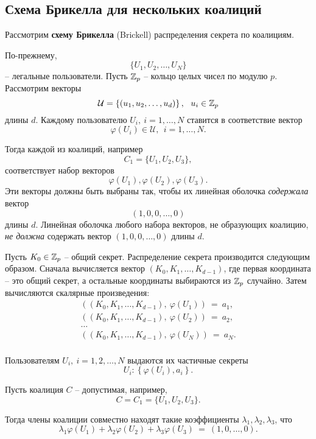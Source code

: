 \subsection{Схема Брикелла для нескольких коалиций}

Рассмотрим \textbf{схему Брикелла} (Brickell) распределения секрета по коалициям.

По-прежнему,
    \[ \{ U_1, U_2, \dots, U_N \} \]
-- легальные пользователи. Пусть $\mathbb{Z}_p$ -- кольцо целых чисел по модулю $p$. Рассмотрим векторы
    \[ \mathcal{U} = \left\{ (u_1, u_2, \dots, u_d) \right\}, ~~ u_i \in \mathbb{Z}_p \]
длины $d$. Каждому пользователю $U_i, ~ i = 1, \dots, N$ ставится в соответствие вектор
    \[ \varphi(U_i) \in \mathcal{U}, ~~ i = 1, \dots, N. \]

Тогда каждой из коалиций, например
    \[ C_1 = \{ U_1, U_2, U_3 \}, \]
соответствует набор векторов
    \[ \varphi(U_1), \varphi(U_2), \varphi(U_3). \]
Эти векторы должны быть выбраны так, чтобы их линейная оболочка \emph{содержала} вектор
    \[ (1, 0, 0, \dots, 0) \]
длины $d$. Линейная оболочка любого набора векторов, не образующих коалицию, \emph{не должна} содержать вектор $(1, 0, 0, \dots, 0)$ длины $d$.

Пусть $K_0 \in \mathbb{Z}_p$ -- общий секрет. Распределение секрета производится следующим образом. Сначала вычисляется вектор $(K_0, K_1, \dots, K_{d-1})$, где первая координата -- это общий секрет, а остальные координаты выбираются из $\mathbb{Z}_p$ случайно. Затем вычисляются скалярные произведения:
\[\begin{array}{l}
	\left( \left( K_0, K_1, \dots, K_{d-1} \right), ~ \varphi(U_1) \right) ~=~ a_1, \\
	\left( \left( K_0, K_1, \dots, K_{d-1} \right), ~ \varphi(U_2) \right) ~=~ a_2, \\
	\dots \\
	\left( \left( K_0, K_1, \dots, K_{d-1} \right), ~ \varphi(U_N) \right) ~=~ a_N. \\
\end{array}\]

Пользователям $U_i, ~ i = 1, 2, \dots, N$ выдаются их частичные секреты
    \[ U_i \colon \left\{ \varphi(U_i), a_i \right\}. \]

Пусть коалиция $C$ -- допустимая, например,
    \[ C = C_1 = \{ U_1, U_2, U_3 \}. \]

Тогда члены коалиции совместно находят такие коэффициенты $\lambda_1, \lambda_2, \lambda_3$, что
    \[ \lambda_1\varphi(U_1)+\lambda_2\varphi(U_2)+\lambda_3\varphi(U_3) ~=~ (1,0, \dots, 0). \]

